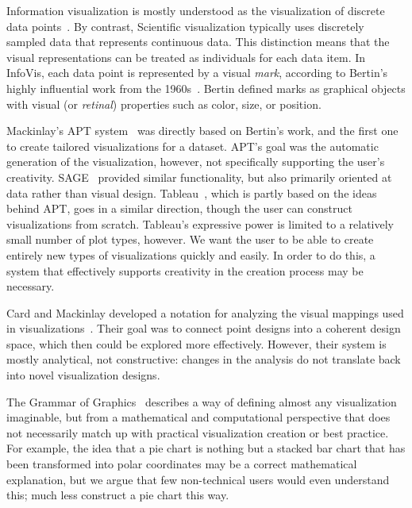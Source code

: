 \label{relatedWork}

\label{theory}

Information visualization is mostly understood as the visualization of discrete data points~\cite{tory2004rethinking}.
By contrast, Scientific visualization typically uses discretely sampled data that represents continuous data.
This distinction means that the visual representations can be treated as individuals for each data item.
In InfoVis, each data point is represented by a visual \textit{mark}, according to Bertin's highly influential work from the 1960s~\cite{bertin1983semiology}.
Bertin defined marks as graphical objects with visual (or \textit{retinal}) properties such as color, size, or position.

Mackinlay's APT system~\cite{Mackinlay1986} was directly based on Bertin's work, and the first one to create tailored visualizations for a dataset.
APT's goal was the automatic generation of the visualization, however, not specifically supporting the user's creativity.
SAGE~\cite{Roth:CHI:1994} provided similar functionality, but also primarily oriented at data rather than visual design.
Tableau~\cite{stolte2002polaris}, which is partly based on the ideas behind APT, goes in a similar direction, though the user can construct visualizations from scratch.
Tableau's expressive power is  limited to a relatively small number of plot types, however.
We want the user to be able to create entirely new types of visualizations quickly and easily.
In order to do this, a system that effectively supports creativity in the creation process may be necessary.

Card and Mackinlay developed a notation for analyzing the visual mappings used in visualizations~\cite{Card1997}.
Their goal was to connect point designs into a coherent design space, which then could be explored more effectively.
However, their system is mostly analytical, not constructive: changes in the analysis do not translate back into novel visualization designs.

The Grammar of Graphics~\cite{Wickham:JCGS:2010,Wilkinson2005c} describes a way of defining almost any visualization imaginable, but from a mathematical and computational perspective that does not necessarily match up with practical visualization creation or best practice.
For example, the idea that a pie chart is nothing but a stacked bar chart that has been transformed into polar coordinates may be a correct mathematical explanation, but we argue that few non-technical users would even understand this; much less construct a pie chart this way.

